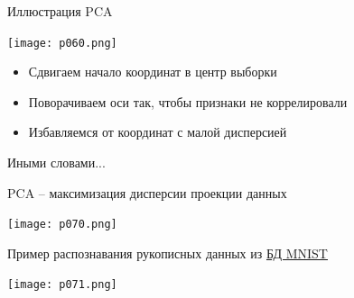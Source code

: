 \documentclass[pdf, intlimits, 9pt, unicode]{beamer}
\begin{document}
\begin{frame}{Иллюстрация PCA}

\begin{center}\texttt{[image: p060.png]}\end{center}

\begin{itemize}
\item Сдвигаем начало координат в центр выборки\pause
\item Поворачиваем оси так, чтобы признаки не коррелировали\pause
\item Избавляемся от координат с малой дисперсией
\end{itemize}

\end{frame}




\begin{frame}{Иными словами...}

PCA -- максимизация дисперсии проекции данных

\begin{center}\texttt{[image: p070.png]}\end{center}

Пример распознавания рукописных данных из \href{http://yann.lecun.com/exdb/mnist/}{БД MNIST}

\begin{center}\texttt{[image: p071.png]}\end{center}
\end{frame}
\end{document}
